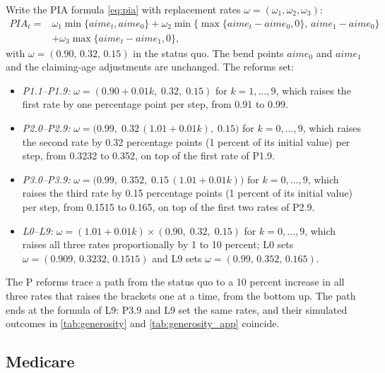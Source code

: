 Write the PIA formula \eqref{eq:pia} with replacement rates $\omega=(\omega_1,\omega_2,\omega_3)$:
\begin{equation*}
\begin{split}
PIA_t={}&\omega_1\min\{aime_t,aime_0\}+\omega_2\min\big\{\max\{aime_t-aime_0,0\},\,aime_1-aime_0\big\}\\
&+\omega_3\max\{aime_t-aime_1,0\},
\end{split}
\end{equation*}
with $\omega=(0.90,\,0.32,\,0.15)$ in the status quo. The bend points $aime_0$ and $aime_1$ and the claiming-age adjustments are unchanged. The reforms set:
\begin{itemize}
\item \textit{P1.1--P1.9:} $\omega=(0.90+0.01k,\;0.32,\;0.15)$ for $k=1,\ldots,9$, which raises the first rate by one percentage point per step, from 0.91 to 0.99.
\item \textit{P2.0--P2.9:} $\omega=\big(0.99,\;0.32\,(1.01+0.01k),\;0.15\big)$ for $k=0,\ldots,9$, which raises the second rate by 0.32 percentage points (1 percent of its initial value) per step, from 0.3232 to 0.352, on top of the first rate of P1.9.
\item \textit{P3.0--P3.9:} $\omega=\big(0.99,\;0.352,\;0.15\,(1.01+0.01k)\big)$ for $k=0,\ldots,9$, which raises the third rate by 0.15 percentage points (1 percent of its initial value) per step, from 0.1515 to 0.165, on top of the first two rates of P2.9.
\item \textit{L0--L9:} $\omega=(1.01+0.01k)\times(0.90,\;0.32,\;0.15)$ for $k=0,\ldots,9$, which raises all three rates proportionally by 1 to 10 percent; L0 sets $\omega=(0.909,\,0.3232,\,0.1515)$ and L9 sets $\omega=(0.99,\,0.352,\,0.165)$.
\end{itemize}
The P reforms trace a path from the status quo to a 10 percent increase in all three rates that raises the brackets one at a time, from the bottom up. The path ends at the formula of L9: P3.9 and L9 set the same rates, and their simulated outcomes in \autoref{tab:generosity} and \autoref{tab:generosity_app} coincide.

\subsection{Medicare}

